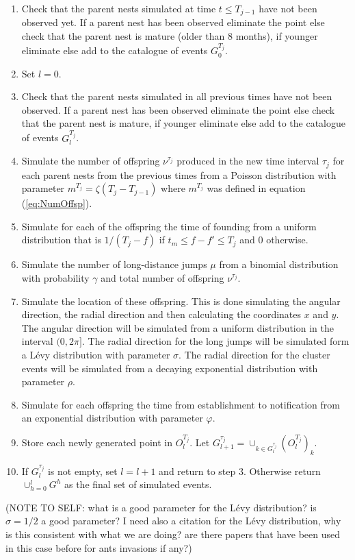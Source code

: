 \documentclass[11pt,a4paper]{article}
\begin{document}
{\begin{enumerate}
    \item Check that the parent nests simulated at time $t \leq T_{j-1}$ have not been observed yet. If a parent nest has been observed eliminate the point else check that the parent nest is mature (older than 8 months), if younger eliminate else add to the catalogue of events $G_0^{T_j}$.
    \item Set $l = 0$.
    \item Check that the parent nests simulated in all previous times have not been observed. If a parent nest has been observed eliminate the point else check that the parent nest is mature, if younger eliminate else add to the catalogue of events $G_l^{T_j}$.
    \item Simulate the number of offspring $\nu^{\tau_j}$ produced in the new time interval $\tau_j$ for each parent nests from the previous times from a Poisson distribution with parameter $ m^{T_j} = \zeta (T_j-T_{j-1})$ where $m^{T_j}$ was defined in equation (\ref{eq:NumOffsp}).
    \item Simulate for each of the offspring the time of founding from a uniform distribution that is $1/(T_j-f)$ if $t_m \leq f - f' \leq T_j$ and $0$ otherwise.
    \item Simulate the number of long-distance jumps $\mu$ from a binomial distribution with probability $\gamma$ and total number of offspring $\nu^{\tau_j}$.
    \item Simulate the location of these offspring. This is done simulating the angular direction, the radial direction and then calculating the coordinates $x$ and $y$. The angular direction will be simulated from a uniform distribution in the interval $(0, 2\pi]$. The radial direction for the long jumps will be simulated form a L\'evy distribution with parameter $\sigma$. The radial direction for the cluster events will be simulated from a decaying exponential distribution with parameter $\rho$.
    \item Simulate for each offspring the time from establishment to notification from an exponential distribution with parameter $\varphi$.
    \item Store each newly generated point in $O_l^{T_j}$. Let $G_{l+1}^{\tau_j} = \cup_{k\in G_l^{\tau_j}} (O_l^{T_j})_k$.
    \item If $G_l^{\tau_j}$ is not empty, set $l = l+1$ and return to step 3. Otherwise return $\cup_{h=0}^l G^h$ as the final set of simulated events.
\end{enumerate}

(NOTE TO SELF: what is a good parameter for the L\'evy distribution? is $\sigma = 1/2$ a good parameter? I need also a citation for the L\'evy distribution, why is this consistent with what we are doing? are there papers that have been used in this case before for ants invasions if any?)
}
\end{document}
